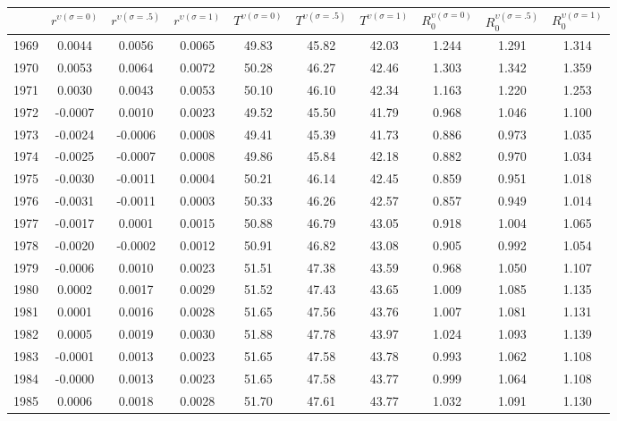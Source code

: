 \begin{tabular}{cccccccccc}
  \hline
 & $r^{\upsilon (\sigma = 0)}$ & $r^{\upsilon (\sigma = .5)}$ & $r^{\upsilon (\sigma = 1)}$ & $T^{\upsilon (\sigma = 0)}$ & $T^{\upsilon (\sigma = .5)}$ & $T^{\upsilon (\sigma = 1)}$ & $R_0^{\upsilon (\sigma = 0)}$ & $R_0^{\upsilon (\sigma = .5)}$ & $R_0^{\upsilon (\sigma = 1)}$ \\ 
  \hline
1969 & 0.0044 & 0.0056 & 0.0065 & 49.83 & 45.82 & 42.03 & 1.244 & 1.291 & 1.314 \\ 
  1970 & 0.0053 & 0.0064 & 0.0072 & 50.28 & 46.27 & 42.46 & 1.303 & 1.342 & 1.359 \\ 
  1971 & 0.0030 & 0.0043 & 0.0053 & 50.10 & 46.10 & 42.34 & 1.163 & 1.220 & 1.253 \\ 
  1972 & -0.0007 & 0.0010 & 0.0023 & 49.52 & 45.50 & 41.79 & 0.968 & 1.046 & 1.100 \\ 
  1973 & -0.0024 & -0.0006 & 0.0008 & 49.41 & 45.39 & 41.73 & 0.886 & 0.973 & 1.035 \\ 
  1974 & -0.0025 & -0.0007 & 0.0008 & 49.86 & 45.84 & 42.18 & 0.882 & 0.970 & 1.034 \\ 
  1975 & -0.0030 & -0.0011 & 0.0004 & 50.21 & 46.14 & 42.45 & 0.859 & 0.951 & 1.018 \\ 
  1976 & -0.0031 & -0.0011 & 0.0003 & 50.33 & 46.26 & 42.57 & 0.857 & 0.949 & 1.014 \\ 
  1977 & -0.0017 & 0.0001 & 0.0015 & 50.88 & 46.79 & 43.05 & 0.918 & 1.004 & 1.065 \\ 
  1978 & -0.0020 & -0.0002 & 0.0012 & 50.91 & 46.82 & 43.08 & 0.905 & 0.992 & 1.054 \\ 
  1979 & -0.0006 & 0.0010 & 0.0023 & 51.51 & 47.38 & 43.59 & 0.968 & 1.050 & 1.107 \\ 
  1980 & 0.0002 & 0.0017 & 0.0029 & 51.52 & 47.43 & 43.65 & 1.009 & 1.085 & 1.135 \\ 
  1981 & 0.0001 & 0.0016 & 0.0028 & 51.65 & 47.56 & 43.76 & 1.007 & 1.081 & 1.131 \\ 
  1982 & 0.0005 & 0.0019 & 0.0030 & 51.88 & 47.78 & 43.97 & 1.024 & 1.093 & 1.139 \\ 
  1983 & -0.0001 & 0.0013 & 0.0023 & 51.65 & 47.58 & 43.78 & 0.993 & 1.062 & 1.108 \\ 
  1984 & -0.0000 & 0.0013 & 0.0023 & 51.65 & 47.58 & 43.77 & 0.999 & 1.064 & 1.108 \\ 
  1985 & 0.0006 & 0.0018 & 0.0028 & 51.70 & 47.61 & 43.77 & 1.032 & 1.091 & 1.130 \\ 

\end{tabular}
